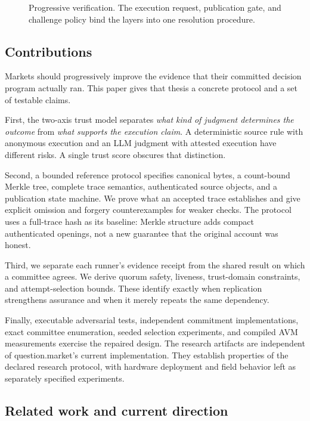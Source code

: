 \begin{figure}[t]
\centering
\resizebox{0.98\linewidth}{!}{}
\caption{Progressive verification. The execution request, publication gate, and challenge policy bind the layers into one resolution procedure.}
\label{fig:stack}
\end{figure}

\subsection{Contributions}

Markets should progressively improve the evidence that their committed decision program actually ran. This paper gives that thesis a concrete protocol and a set of testable claims.

First, the two-axis trust model separates \emph{what kind of judgment determines the outcome} from \emph{what supports the execution claim}. A deterministic source rule with anonymous execution and an LLM judgment with attested execution have different risks. A single trust score obscures that distinction.

Second, a bounded reference protocol specifies canonical bytes, a count-bound Merkle tree, complete trace semantics, authenticated source objects, and a publication state machine. We prove what an accepted trace establishes and give explicit omission and forgery counterexamples for weaker checks. The protocol uses a full-trace hash as its baseline: Merkle structure adds compact authenticated openings, not a new guarantee that the original account was honest.

Third, we separate each runner's evidence receipt from the shared result on which a committee agrees. We derive quorum safety, liveness, trust-domain constraints, and attempt-selection bounds. These identify exactly when replication strengthens assurance and when it merely repeats the same dependency.

Finally, executable adversarial tests, independent commitment implementations, exact committee enumeration, seeded selection experiments, and compiled AVM measurements exercise the repaired design. The research artifacts are independent of question.market's current implementation. They establish properties of the declared research protocol, with hardware deployment and field behavior left as separately specified experiments.

\subsection{Related work and current direction}

